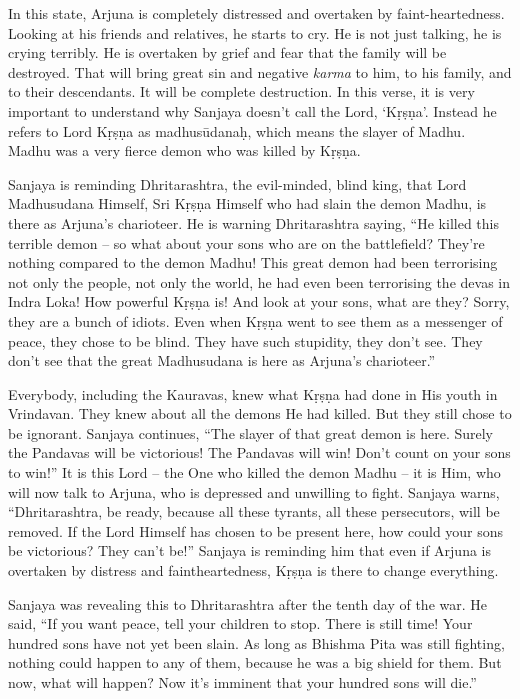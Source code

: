 In this state, Arjuna is completely distressed and overtaken by faint-heartedness. Looking at his friends and relatives, he starts to cry. He is not just talking, he is crying terribly. He is overtaken by grief and fear that the family will be destroyed. That will bring great sin and negative \textit{karma} to him, to his family, and to their descendants. It will be complete destruction. In this verse, it is very important to understand why Sanjaya doesn’t call the Lord, ‘Kṛṣṇa’. Instead he refers to Lord Kṛṣṇa as madhusūdanaḥ, which means the slayer of Madhu. Madhu was a very fierce demon who was killed by Kṛṣṇa.

Sanjaya is reminding Dhritarashtra, the evil-minded, blind king, that Lord Madhusudana Himself, Sri Kṛṣṇa Himself who had slain the demon Madhu, is there as Arjuna’s charioteer. He is warning Dhritarashtra saying, “He killed this terrible demon -- so what about your sons who are on the battlefield? They’re nothing compared to the demon Madhu! This great demon had been terrorising not only the people, not only the world, he had even been terrorising the devas in Indra Loka! How powerful Kṛṣṇa is! And look at your sons, what are they? Sorry, they are a bunch of idiots. Even when Kṛṣṇa went to see them as a messenger of peace, they chose to be blind. They have such stupidity, they don’t see. They don’t see that the great Madhusudana is here as Arjuna’s charioteer.”

Everybody, including the Kauravas, knew what Kṛṣṇa had done in His youth in Vrindavan. They knew about all the demons He had killed. But they still chose to be ignorant. Sanjaya continues, “The slayer of that great demon is here. Surely the Pandavas will be victorious! The Pandavas will win! Don’t count on your sons to win!” It is this Lord – the One who killed the demon Madhu – it is Him, who will now talk to Arjuna, who is depressed and unwilling to fight. Sanjaya warns, “Dhritarashtra, be ready, because all these tyrants, all these persecutors, will be removed. If the Lord Himself has chosen to be present here, how could your sons be victorious? They can’t be!” Sanjaya is reminding him that even if Arjuna is overtaken by distress and faintheartedness, Kṛṣṇa is there to change everything.

Sanjaya was revealing this to Dhritarashtra after the tenth day of the war. He said, “If you want peace, tell your children to stop. There is still time! Your hundred sons have not yet been slain. As long as Bhishma Pita was still fighting, nothing could happen to any of them, because he was a big shield for them. But now, what will happen? Now it’s imminent that your hundred sons will die.”

